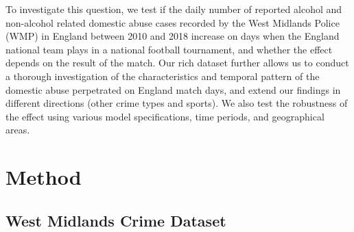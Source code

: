 \documentclass[12pt, a4paper]{article}
\begin{document}
To investigate this question, we test if the daily number of reported alcohol and non-alcohol related domestic abuse cases recorded by the West Midlands Police (WMP) in England between 2010 and 2018 increase on days when the England national team plays in a national football tournament, and whether the effect depends on the result of the match. Our rich dataset further allows us to conduct a thorough investigation of the characteristics and temporal pattern of the domestic abuse perpetrated on England match days, and extend our findings in different directions (other crime types and sports). We also test the robustness of the effect using various model specifications, time periods, and geographical areas. 



\newpage
\section*{Method}


\subsection*{West Midlands Crime Dataset}

\end{document}
